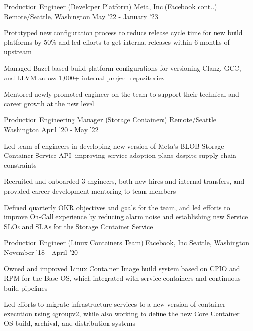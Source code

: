\begin{cventries}
\cventry
	{Production Engineer \color{solarized-orange}(Developer Platform)} %
	{Meta, Inc (Facebook cont..)} %
    {Remote/Seattle, Washington} %
    {May '22 - January '23} %
    {
        \begin{cvitems}
		  \item Prototyped new configuration process to reduce release cycle time for new build platforms by 50\% and led efforts to get internal releases within 6 months of upstream
		  \item Managed Bazel-based build platform configurations for versioning Clang, GCC, and LLVM across 1,000+ internal project repositories
		  \item Mentored newly promoted engineer on the team to support their technical and career growth at the new level
        \end{cvitems}
    }
\vspace{0mm}
\cventry
	{Production Engineering Manager \color{solarized-orange}(Storage Containers)} %
    {} %
    {Remote/Seattle, Washington} %
    {April '20 - May '22} %
    {
        \begin{cvitems}
		\item Led team of engineers in developing new version of Meta's BLOB Storage Container Service API, improving service adoption plans despite supply chain constraints
		\item Recruited and onboarded 3 engineers, both new hires and internal transfers, and provided career development mentoring to team members
		\item Defined quarterly OKR objectives and goals for the team, and led efforts to improve On-Call experience by reducing alarm noise and establishing new Service SLOs and SLAs for the Storage Container Service
        \end{cvitems}
    }
\vspace{2mm}
\cventry
	{Production Engineer \color{solarized-orange}(Linux Containers Team)} %
    {Facebook, Inc} %
    {Seattle, Washington} %
    {November '18 - April '20} %
    {
        \begin{cvitems}
		  \item Owned and improved Linux Container Image build system based on CPIO and RPM for the Base OS, which integrated with service containers and continuous build pipelines
		  \item Led efforts to migrate infrastructure services to a new version of container execution using cgroupv2, while also working to define the new Core Container OS build, archival, and distribution systems

\end{cvitems}}
\end{cventries}
